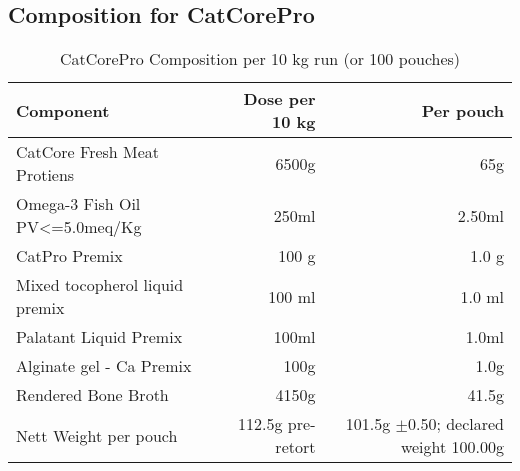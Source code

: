 \subsection*{Composition for CatCorePro}

\begin{table}[h]
\centering
\begin{tabular}{@{}l r r@{}}
\toprule
\textbf{Component} & \textbf{Dose per 10 kg} & \textbf{Per pouch} \\
\midrule
CatCore Fresh Meat Protiens & 6500g & 65g \\ [3pt]
Omega-3 Fish Oil PV<=5.0meq/Kg & 250ml & 2.50ml \\[3pt]
CatPro Premix & 100 g & 1.0 g \\[3pt]
Mixed tocopherol liquid premix & 100 ml & 1.0 ml \\[3pt]
Palatant Liquid Premix & 100ml & 1.0ml \\[3pt]
Alginate gel - Ca Premix & 100g & 1.0g \\[3pt]
\midrule
Rendered Bone Broth & 4150g & 41.5g  \\[3pt]
\midrule
Nett Weight per pouch & 112.5g pre-retort & 101.5g $\pm$0.50; declared weight 100.00g\\[3pt]
\bottomrule
\end{tabular}
\caption{CatCorePro Composition per 10 kg run (or 100 pouches)}
\label{tab catcorepro_composition}
\end{table}

